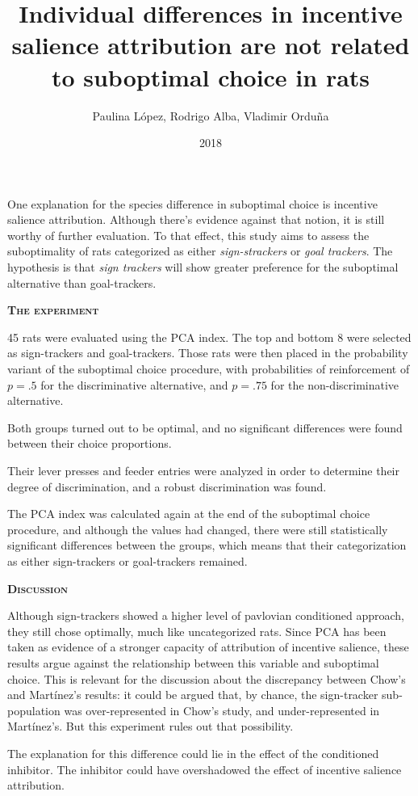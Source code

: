 \documentclass[a4paper,12pt]{article}
\title{Individual differences in incentive salience attribution are not related to suboptimal choice in rats}
\author{Paulina López, Rodrigo Alba, Vladimir Orduña}
\date{2018}
\begin{document}
{\scshape\bfseries \maketitle}

One explanation for the species difference in suboptimal choice is incentive salience attribution. Although there's evidence against that notion, it is still worthy of further evaluation. To that effect, this study aims to assess the suboptimality of rats categorized as either {\itshape sign-strackers} or {\itshape goal trackers}. The hypothesis is that {\itshape sign trackers} will show greater preference for the suboptimal alternative than goal-trackers.

{\scshape\bfseries The experiment}

45 rats were evaluated using the PCA index. The top and bottom 8 were selected as sign-trackers and goal-trackers. Those rats were then placed in the probability variant of the suboptimal choice procedure, with probabilities of reinforcement of $p={.}5$ for the discriminative alternative, and $p={.}75$ for the non-discriminative alternative.

Both groups turned out to be optimal, and no significant differences were found between their choice proportions.

Their lever presses and feeder entries were analyzed in order to determine their degree of discrimination, and a robust discrimination was found.

The PCA index was calculated again at the end of the suboptimal choice procedure, and although the values had changed, there were still statistically significant differences between the groups, which means that their categorization as either sign-trackers or goal-trackers remained.

{\scshape\bfseries Discussion}

Although sign-trackers showed a higher level of pavlovian conditioned approach, they still chose optimally, much like uncategorized rats. Since PCA has been taken as evidence of a stronger capacity of attribution of incentive salience, these results argue against the relationship between this variable and suboptimal choice. This is relevant for the discussion about the discrepancy between Chow's and Martínez's results: it could be argued that, by chance, the sign-tracker sub-population was over-represented in Chow's study, and under-represented in Martínez's. But this experiment rules out that possibility.

The explanation for this difference could lie in the effect of the conditioned inhibitor. The inhibitor could have overshadowed the effect of incentive salience attribution.
\end{document}
